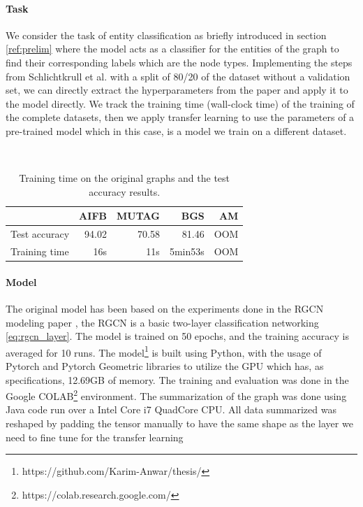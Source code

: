 \documentclass[11pt]{article}
\begin{document}
\paragraph{Task}
We consider the task of entity classification as briefly introduced in section \ref{ref:prelim} where the model acts as a classifier for the entities of the graph to find their corresponding labels which are the node types. Implementing the steps from Schlichtkrull et al. \cite{schlichtkrull2017modeling} with a split of 80/20 of the dataset without a validation set, we can directly extract the hyperparameters from the paper and apply it to the model directly. We track the training time (wall-clock time) of the training of the complete datasets, then we apply transfer learning to use the parameters of a pre-trained model which in this case, is a model we train on a different dataset.

\\
\begin{table}[htp!]
\centering
\begin{tabular}{lrrrr}
\toprule
 & AIFB & MUTAG & BGS & AM  \\ \midrule
Test accuracy    &  94.02 & 70.58 & 81.46 & OOM \\
Training time   & 16s & 11s & 5min53s & OOM \\

 \bottomrule
\end{tabular}
\caption{Training time on the original graphs and the test accuracy results.}
\label{table:training_time}
\end{table}

\paragraph{Model}
The original model has been based on the experiments done in the RGCN modeling paper \cite{schlichtkrull2017modeling}, the RGCN is a basic two-layer classification networking \eqref{eq:rgcn_layer}. The model is trained on 50 epochs, and the training accuracy is averaged for 10 runs. The model\footnote{https://github.com/Karim-Anwar/thesis/} is built using Python, with the usage of Pytorch and Pytorch Geometric libraries to utilize the GPU which has, as specifications, 12.69GB of memory. The training and evaluation was done in the Google COLAB\footnote{https://colab.research.google.com/} environment. The summarization of the graph was done using Java code run over a Intel Core i7 QuadCore CPU. All data summarized was reshaped by padding the tensor manually to have the same shape as the layer we need to fine tune for the transfer learning
\end{document}
